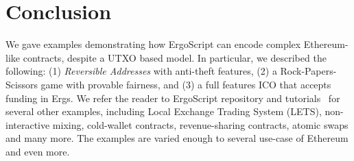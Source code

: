 \documentclass[runningheads]{llncs}
\newcommand{\langname}{ErgoScript\xspace}
\begin{document}
\section{Conclusion}

We gave examples demonstrating how \langname can encode complex Ethereum-like contracts, despite a UTXO based model. In particular, we described the following: (1) {\em Reversible Addresses} with anti-theft features, (2) a Rock-Papers-Scissors game with provable fairness, and (3) a full features ICO that accepts funding in Ergs. We refer the reader to \langname repository and tutorials~\cite{langrepo,tutorial,advtutorial} for several other examples, including  Local Exchange Trading System (LETS), non-interactive mixing, cold-wallet contracts, revenue-sharing contracts, atomic swaps and many more.
The examples are varied enough to several use-case of Ethereum and even more. 



\end{document}
